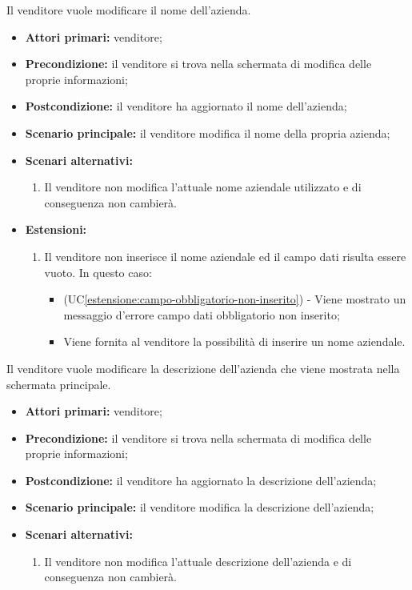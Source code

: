 Il venditore vuole modificare il nome dell'azienda.
\begin{itemize}
	\item \textbf{Attori primari:} venditore;
	\item \textbf{Precondizione:} il venditore si trova nella schermata di modifica delle proprie informazioni;
	\item \textbf{Postcondizione:} il venditore ha aggiornato il nome dell'azienda;
	\item \textbf{Scenario principale:} il venditore modifica il nome della propria azienda;
	\item \textbf{Scenari alternativi:}
	\begin{enumerate}[label=\lett]
		\item Il venditore non modifica l'attuale nome aziendale utilizzato e di conseguenza non cambierà.
	\end{enumerate}
	\item \textbf{Estensioni:}
	\begin{enumerate}[label=\lett]
		\item Il venditore non inserisce il nome aziendale ed il campo dati risulta essere vuoto. In questo caso:
		\begin{itemize}
			\item (UC\ref{estensione:campo-obbligatorio-non-inserito}) - Viene mostrato un messaggio d'errore campo dati obbligatorio non inserito;
			\item Viene fornita al venditore la possibilità di inserire un nome aziendale.
		\end{itemize}
	\end{enumerate} 
\end{itemize}

\label{modifica-informazioni-venditore.descrizione-azienda}

Il venditore vuole modificare la descrizione dell'azienda che viene mostrata nella schermata principale.
\begin{itemize}
    \item \textbf{Attori primari:} venditore;
    \item \textbf{Precondizione:} il venditore si trova nella schermata di modifica delle proprie informazioni;
    \item \textbf{Postcondizione:} il venditore ha aggiornato la descrizione dell'azienda;
    \item \textbf{Scenario principale:} il venditore modifica la descrizione dell'azienda;
    \item \textbf{Scenari alternativi:}
    \begin{enumerate}[label=\lett]
    	\item Il venditore non modifica l'attuale descrizione dell'azienda e di conseguenza non cambierà.
    \end{enumerate}
\end{itemize}